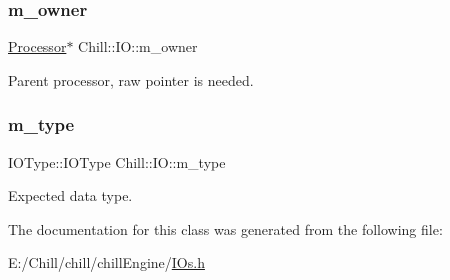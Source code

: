\subsubsection{\texorpdfstring{m\+\_\+owner}{m\_owner}}
{\footnotesize\ttfamily \mbox{\hyperlink{class_chill_1_1_processor}{Processor}}$\ast$ Chill\+::\+I\+O\+::m\+\_\+owner}

Parent processor, raw pointer is needed. \mbox{\label{class_chill_1_1_i_o_adc235c7126e87e8af02631b5b9a94b0a}} 
\subsubsection{\texorpdfstring{m\+\_\+type}{m\_type}}
{\footnotesize\ttfamily I\+O\+Type\+::\+I\+O\+Type Chill\+::\+I\+O\+::m\+\_\+type}

Expected data type. 

The documentation for this class was generated from the following file\+:\begin{DoxyCompactItemize}
\item 
E\+:/\+Chill/chill/chill\+Engine/\mbox{\hyperlink{_i_os_8h}{I\+Os.\+h}}\end{DoxyCompactItemize}
